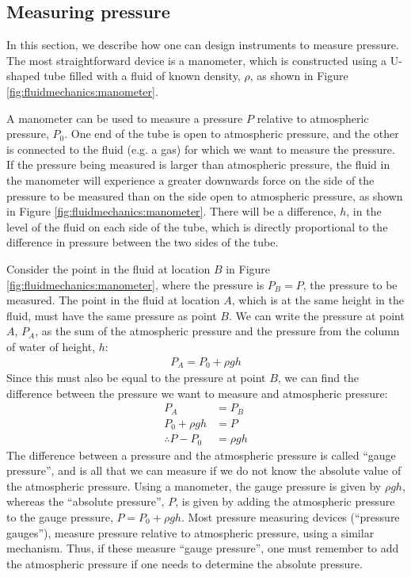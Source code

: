\subsection{Measuring pressure}
In this section, we describe how one can design instruments to measure pressure. The most straightforward device is a manometer, which is constructed using a U-shaped tube filled with a fluid of known density, $\rho$, as shown in Figure \ref{fig:fluidmechanics:manometer}.
{
A manometer can be used to measure a pressure $P$ relative to atmospheric pressure, $P_0$. One end of the tube is open to atmospheric pressure, and the other is connected to the fluid (e.g. a gas) for which we want to measure the pressure. If the pressure being measured is larger than atmospheric pressure, the fluid in the manometer will experience a greater downwards force on the side of the pressure to be measured than on the side open to atmospheric pressure, as shown in Figure \ref{fig:fluidmechanics:manometer}. There will be a difference, $h$, in the level of the fluid on each side of the tube, which is directly proportional to the difference in pressure between the two sides of the tube.

Consider the point in the fluid at location $B$ in Figure \ref{fig:fluidmechanics:manometer}, where the pressure is $P_B=P$, the pressure to be measured. The point in the fluid at location $A$, which is at the same height in the fluid, must have the same pressure as point $B$. We can write the pressure at point $A$, $P_A$, as the sum of the atmospheric pressure and the pressure from the column of water of height, $h$:
\begin{align*}
P_A=P_0+\rho g h
\end{align*}
Since this must also be equal to the pressure at point $B$, we can find the difference between the pressure we want to measure and atmospheric pressure:
\begin{align*}
P_A &= P_B \\
P_0+\rho g h &= P\\
\therefore P - P_0 &= \rho g h 
\end{align*}
The difference between a pressure and the atmospheric pressure is called ``gauge pressure'', and is all that we can measure if we do not know the absolute value of the atmospheric pressure. Using a manometer, the gauge pressure is given by $\rho g h$, whereas the ``absolute pressure'', $P$, is given by adding the atmospheric pressure to the gauge pressure, $P = P_0 + \rho g h$. Most pressure measuring devices (``pressure gauges''), measure pressure relative to atmospheric pressure, using a similar mechanism. Thus, if these measure ``gauge pressure'', one must remember to add the atmospheric pressure if one needs to determine the absolute pressure.

}
